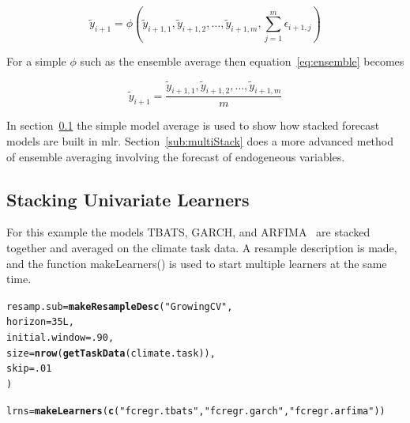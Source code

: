\documentclass{article}\usepackage[]{graphicx}\usepackage[]{color}
\makeatletter
\newcommand{\hlnum}[1]{\textcolor[rgb]{0.686,0.059,0.569}{#1}}%
\newcommand{\hlstr}[1]{\textcolor[rgb]{0.192,0.494,0.8}{#1}}%
\newcommand{\hlstd}[1]{\textcolor[rgb]{0.345,0.345,0.345}{#1}}%
\newcommand{\hlkwb}[1]{\textcolor[rgb]{0.69,0.353,0.396}{#1}}%
\newcommand{\hlkwc}[1]{\textcolor[rgb]{0.333,0.667,0.333}{#1}}%
\newcommand{\hlkwd}[1]{\textcolor[rgb]{0.737,0.353,0.396}{\textbf{#1}}}%
\newenvironment{kframe}{%
 \def\at@end@of@kframe{}%
 \ifinner\ifhmode%
  \def\at@end@of@kframe{\end{minipage}}%
  \begin{minipage}{\columnwidth}%
 \fi\fi%
 \def\FrameCommand##1{\hskip\@totalleftmargin \hskip-\fboxsep
 \colorbox{shadecolor}{##1}\hskip-\fboxsep
     \hskip-\linewidth \hskip-\@totalleftmargin \hskip\columnwidth}%
 \MakeFramed {\advance\hsize-\width
   \@totalleftmargin\z@ \linewidth\hsize
   \@setminipage}}%
 {\par\unskip\endMakeFramed%
 \at@end@of@kframe}
\newenvironment{knitrout}{}{} %
\theoremstyle{definition}
\newcommand\code{\@codex}
\def\@codex#1{{\normalfont\ttfamily\hyphenchar\font=-1 #1}}
\newcommand{\pkg}[1]{{\fontseries{b}\selectfont #1}}
\makeatother
\begin{document}
\begin{equation}
\tilde{y}_{i+1} = \phi(\tilde{y}_{i+1,1}, \tilde{y}_{i+1,2},\dots, \tilde{y}_{i+1,m}, \sum_{j=1}^m \epsilon_{i+1,j})
\label{eq:ensemble}
\end{equation}

For a simple $\phi$ such as the ensemble average then equation~\ref{eq:ensemble} becomes

\begin{equation}
\tilde{y}_{i+1} = \frac{\tilde{y}_{i+1,1}, \tilde{y}_{i+1,2},\dots, \tilde{y}_{i+1,m}}{m}
\label{eq:ensembleAverage}
\end{equation}

In section~\ref{sub:stackedUnivar} the simple model average is used to show how stacked forecast models are built in \pkg{mlr}. Section~\ref{sub:multiStack} does a more advanced method of ensemble averaging involving the forecast of endogeneous variables.

\subsection{Stacking Univariate Learners}
\label{sub:stackedUnivar}

For this example the models TBATS, GARCH, and ARFIMA~\cite{arfima} are stacked together and averaged on the climate task data. A resample description is made, and the function \code{makeLearners()} is used to start multiple learners at the same time.
\begin{knitrout}
\color{fgcolor}\begin{kframe}
\begin{alltt}
\hlstd{resamp.sub} \hlkwb{=} \hlkwd{makeResampleDesc}\hlstd{(}\hlstr{"GrowingCV"}\hlstd{,}
                          \hlkwc{horizon} \hlstd{=} \hlnum{35L}\hlstd{,}
                          \hlkwc{initial.window} \hlstd{=} \hlnum{.90}\hlstd{,}
                          \hlkwc{size} \hlstd{=} \hlkwd{nrow}\hlstd{(}\hlkwd{getTaskData}\hlstd{(climate.task)),}
                          \hlkwc{skip} \hlstd{=} \hlnum{.01}
                          \hlstd{)}

\hlstd{lrns} \hlkwb{=} \hlkwd{makeLearners}\hlstd{(}\hlkwd{c}\hlstd{(}\hlstr{"fcregr.tbats"}\hlstd{,}\hlstr{"fcregr.garch"}\hlstd{,} \hlstr{"fcregr.arfima"}\hlstd{))}
\end{alltt}
\end{kframe}
\end{knitrout}
\end{document}
